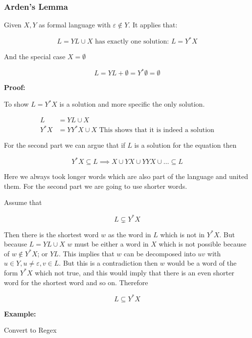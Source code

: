 \subsubsection{Arden's Lemma}

Given \(X,Y\) as formal language with \(\varepsilon \notin Y\). It applies that:

\[
    L = YL \cup X \text{ has exactly one solution: } L = Y^*X
\]

And the special case \(X = \emptyset\)

\[
L = YL + \emptyset = Y^* \emptyset = \emptyset
\]

\textbf{Proof:}

To show \(L = Y^*X\) is a solution and more specific the only solution.

\begin{align*}
    L &= YL \cup X\\
    Y^*X &= YY^*X \cup X \text{ This shows that it is indeed a solution}
\end{align*}

For the second part we can argue that if \(L\) is a solution for the equation then 

\[
    Y^*X \subseteq L \implies X \cup YX \cup YYX \cup \dots \subseteq L
\]

Here we always took longer words which are also part of the language and united them. For the second 
part we are going to use shorter words.

Assume that

\[
    L \subsetneq Y^*X 
\]

Then there is the shortest word \(w\) as the word in \(L\) which is not in \(Y^*X\). But 
because \(L = YL \cup X\) \(w\) must be either a word in \(X\) which is not possible because of 
\(w \notin Y^*X\); or \(YL\). This implies that \(w\) can be decomposed into \(uv\) with 
\(u \in Y, u \neq \varepsilon, v \in L\). But this is a contradiction then \(w\) would be a word of the 
form \(Y^*X\) which not true, and this would imply that there is an even shorter word for the shortest word 
and so on. Therefore 

\[
    L \subseteq Y^*X  
\]

\QED

\textbf{Example:}

Convert to Regex

